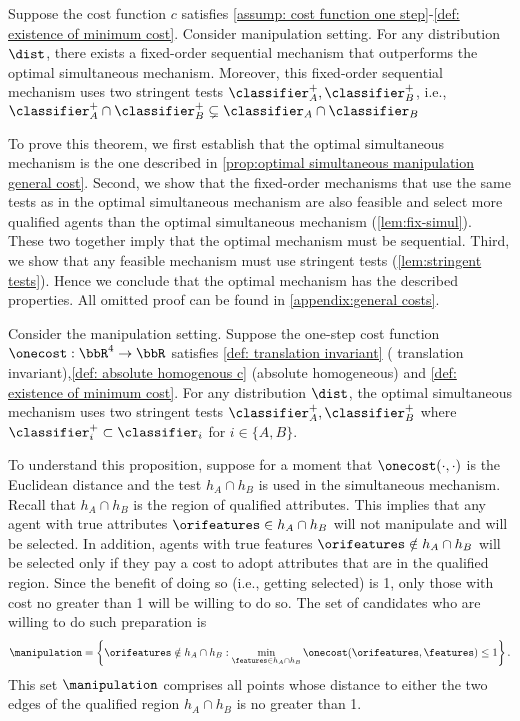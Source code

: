 \begin{proposition}\label{thm:opt_manipulation}
    Suppose the cost function $c$ satisfies \cref{assump: cost function one step}-\ref{def: existence of minimum cost}.
    Consider manipulation setting.
    For any distribution $\dist$, there exists a fixed-order sequential mechanism that outperforms the optimal simultaneous mechanism. Moreover, this fixed-order sequential mechanism 
    uses two stringent tests $\classifier_A^+, \classifier_B^+$, i.e., $\classifier_A^+  \cap \classifier_B^+ \subsetneq \classifier_A\cap \classifier_B$
\end{proposition}


To prove this theorem, we first establish that the optimal simultaneous mechanism is the one described in \cref{prop:optimal simultaneous manipulation general cost}.
Second, we show that the fixed-order mechanisms that use the same tests as in the optimal simultaneous mechanism are also feasible 
 and select more qualified agents than the optimal simultaneous mechanism (\cref{lem:fix-simul}).
These two together imply that the optimal mechanism must be sequential.
Third, we show that any feasible mechanism must use stringent tests (\cref{lem:stringent tests}).
Hence we conclude that the optimal mechanism has the described properties.
All omitted proof can be found in \cref{appendix:general costs}.



 \begin{proposition}\label{prop:optimal simultaneous manipulation general cost}
 Consider the manipulation setting.
    Suppose the one-step cost function $\onecost : \bbR^4 \to \bbR$  satisfies \cref{def: translation invariant} ( translation invariant),\cref{def: absolute homogenous c} (absolute homogeneous) and \cref{def: existence of minimum cost}.
    For any distribution $\dist$, the optimal simultaneous mechanism uses two stringent tests $\classifier_A^{+},\classifier_B^{+}$ where $\classifier_i^{+}\subset \classifier_i$ for $i\in \{A,B\}$.
    \end{proposition}

To understand this proposition, suppose for a moment that $\onecost(\cdot,\cdot)$ is the Euclidean distance and the test $h_{A}\cap h_{B}$ is used in the simultaneous mechanism. Recall that $%
h_{A}\cap h_{B}$ is the region of qualified attributes.
This implies that any agent with true attributes $\orifeatures\in h_{A}\cap h_{B}$
will not manipulate and will be selected. In addition, agents with true
features $\orifeatures\notin h_{A}\cap h_{B}$ will be selected only if they pay a
 cost to adopt attributes that are in the qualified region. Since
the benefit of doing so (i.e., getting selected) is 1, only those with cost
no greater than 1 will be willing to do so. The set of candidates who are
willing to do such preparation is 
\[
\manipulation=\left\{ \orifeatures\notin h_{A}\cap h_{B}:\min_{\features\in h_{A}\cap
h_{B}}\onecost(\orifeatures,\features)\leq 1\right\} \text{.}
\]%
This set $\manipulation$ comprises all points whose distance to either the two edges of
the qualified region $h_{A}\cap h_{B}$ is no greater than 1.

